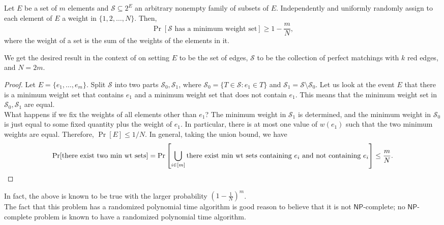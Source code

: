 \begin{flem}
\label{isolation lemma}
	Let $E$ be a set of $m$ elements and $\mathcal{S} \subseteq 2^E$ an arbitrary nonempty family of subsets of $E$. Independently and uniformly randomly assign to each element of $E$ a weight in $\{1,2,\ldots,N\}$. Then,
	\[ \Pr\left[ \mathcal{S} \text{ has a minimum weight set} \right] \ge 1 - \frac{m}{N}, \]
	where the weight of a set is the sum of the weights of the elements in it.
\end{flem}
We get the desired result in the context of  on setting $E$ to be the set of edges, $\mathcal{S}$ to be the collection of perfect matchings with $k$ red edges, and $N = 2m$.
\begin{proof}
	Let $E = \{e_1,\ldots,e_m\}$. Split $\mathcal{S}$ into two parts $\mathcal{S}_0,\mathcal{S}_1$, where $\mathcal{S}_0 = \{ T \in \mathcal{S} : e_1 \in T \}$ and $\mathcal{S}_1 = \mathcal{S} \setminus \mathcal{S}_0$. Let us look at the event $E$ that there is a minimum weight set that contains $e_1$ and a minimum weight set that does not contain $e_1$. This means that the minimum weight set in $\mathcal{S}_0,\mathcal{S}_1$ are equal.\\
	What happens if we fix the weights of all elements other than $e_1$? The minimum weight in $\mathcal{S}_1$ is determined, and the minimum weight in $\mathcal{S_0}$ is just equal to some fixed quantity plus the weight of $e_1$. In particular, there is at most one value of $w(e_1)$ such that the two minimum weights are equal. Therefore, $\Pr[E] \le 1/N$. In general, taking the union bound, we have
	\[ \Pr[\text{there exist two min wt sets}] = \Pr\left[ \bigcup_{i \in [m]} \text{there exist min wt sets containing $e_i$ and not containing $e_i$} \right] \le \frac{m}{N}. \qedhere \]
\end{proof}

In fact, the above is known to be true with the larger probability $\left(1 - \frac{1}{N}\right)^m$.\\
The fact that this problem has a randomized polynomial time algorithm is good reason to believe that it is not $\mathsf{NP}$-complete; no $\mathsf{NP}$-complete problem is known to have a randomized polynomial time algorithm.


